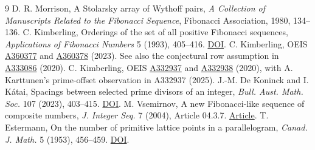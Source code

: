 \documentclass[11pt]{article}
\begin{document}
\begin{thebibliography}{9}
 D. R. Morrison, A Stolarsky array of Wythoff pairs,
\emph{A Collection of Manuscripts Related to the Fibonacci Sequence},
Fibonacci Association, 1980, 134--136.
 C. Kimberling, Orderings of the set of all positive Fibonacci
sequences, \emph{Applications of Fibonacci Numbers} 5 (1993), 405--416.
\href{https://doi.org/10.1007/978-94-011-2058-6_39}{DOI}.
 C. Kimberling, OEIS \href{https://oeis.org/A360377}{A360377}
and \href{https://oeis.org/A360378}{A360378} (2023). See also the conjectural
row assumption in \href{https://oeis.org/A333086}{A333086} (2020).
 C. Kimberling, OEIS \href{https://oeis.org/A332937}{A332937}
and \href{https://oeis.org/A332938}{A332938} (2020), with A. Karttunen's
prime-offset observation in A332937 (2025).
 J.-M. De Koninck and I. K\'atai, Spacings between selected
prime divisors of an integer, \emph{Bull. Aust. Math. Soc.} 107 (2023), 403--415.
\href{https://doi.org/10.1017/S0004972722000880}{DOI}.
 M. Vsemirnov, A new Fibonacci-like sequence of composite
numbers, \emph{J. Integer Seq.} 7 (2004), Article 04.3.7.
\href{https://cs.uwaterloo.ca/journals/JIS/VOL7/Vsemirnov/vsem5.pdf}{Article}.
 T. Estermann, On the number of primitive lattice points in a
parallelogram, \emph{Canad. J. Math.} 5 (1953), 456--459.
\href{https://doi.org/10.4153/CJM-1953-051-6}{DOI}.
\end{thebibliography}
\end{document}
